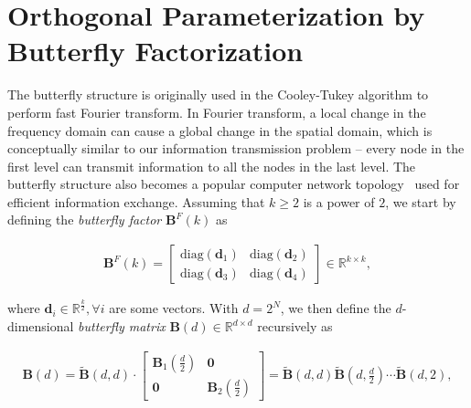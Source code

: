 \section{Orthogonal Parameterization by Butterfly Factorization}

The butterfly structure is originally used in the Cooley-Tukey algorithm to perform fast Fourier transform. In Fourier transform, a local change in the frequency domain can cause a global change in the spatial domain, which is conceptually similar to our information transmission problem -- every node in the first level can transmit information to all the nodes in the last level. The butterfly structure also becomes a popular computer network topology~\cite{solihin2015fundamentals,li2011linear} used for efficient information exchange. Assuming that $k\geq 2$ is a power of $2$, we start by defining the \emph{butterfly factor} $\bm{B}^F(k)$ as

\begin{equation}\label{eq:but_factor}
\begin{aligned}
    \bm{B}^F(k)=\begin{bmatrix}
    \text{diag}(\bm{d}_1) & \text{diag}(\bm{d}_2) \\
    \text{diag}(\bm{d}_3) & \text{diag}(\bm{d}_4)
    \end{bmatrix}\in\mathbb{R}^{k\times k},
\end{aligned}
\end{equation}

where $\bm{d}_i\in\mathbb{R}^{\frac{k}{2}},\forall i$ are some vectors. With $d=2^N$, we then define the $d$-dimensional \emph{butterfly matrix} $\bm{B}(d)\in\mathbb{R}^{d\times d}$ recursively as

\begin{equation}
\begin{aligned}
    \!\!\bm{B}(d)=\tilde{\bm{B}}(d,d)\!\cdot\!\begin{bmatrix}
    \bm{B}_1(\frac{d}{2})\!\!\!\!\! & \bm{0} \\
    \bm{0}\!\!\!\!\! &\bm{B}_2(\frac{d}{2})
    \end{bmatrix}= \tilde{\bm{B}}(d,d)\tilde{\bm{B}}(d,\frac{d}{2})\cdots\tilde{\bm{B}}(d,2),
\end{aligned}
\end{equation}

